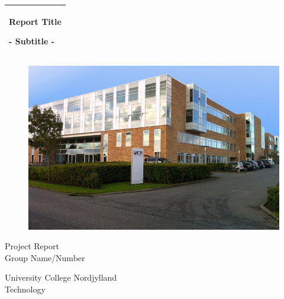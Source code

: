 %
\begin{titlepage}
  \addtolength{\hoffset}{0.5\evensidemargin-0.5\oddsidemargin} %
  \noindent%
  \begin{tabular}{@{}p{\textwidth}@{}}
    \toprule[2pt]
    \midrule
    \vspace{0.2cm}
    \begin{center}
    \Huge{\textbf{
      Report Title%
    }}
    \end{center}
    \begin{center}
      \Large{
        - Subtitle -%
      }
    \end{center}
    \vspace{0.2cm}\\
    \midrule
    \toprule[2pt]
  \end{tabular}
  
  \begin{figure}[H]
    \centering
  \includegraphics[width=\textwidth]{figures/formalities/ucn_forside.jpg}
  \end{figure}
  
  \vspace{3 cm}
  \begin{center}
    {\large
      Project Report%
    }\\
    \vspace{0.2cm}
    {\Large
      Group Name/Number%
    }
  \end{center}
  \vfill
  \begin{center}
  University College Nordjylland\\
  Technology
  \end{center}
\end{titlepage}
\clearpage

